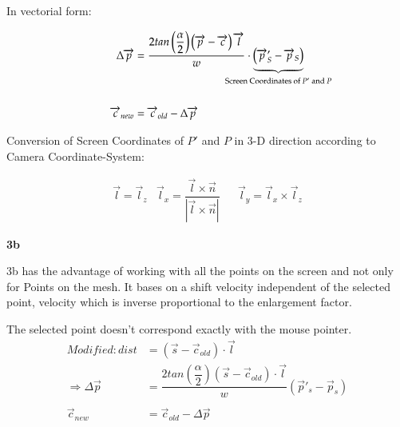 In vectorial form:                                                                                                                                                                                                                     

\begin{align*}  \Delta\overrightarrow{p} &= \dfrac{2tan\left(\dfrac{\alpha}{2}\right)\left(\overrightarrow{p} - \overrightarrow{c}\right) \overrightarrow{l}}{w} \cdot \underbrace{\left(\overrightarrow{p}'_{S} - \overrightarrow{p}_{S}\right)}_{ 
		\mathclap{\text{Screen Coordinates of $P'$ and $P$}}} \\                                                                                                                                                                                      \\ 
	\overrightarrow{c}_{new} &= \overrightarrow{c}_{old} -\Delta\overrightarrow{p}                                                                                                                                                                      
\end{align*}

Conversion of Screen Coordinates of $P'$ and $P$ in 3-D direction according to Camera Coordinate-System:

\begin{align*}
	& \overrightarrow{l} = \overrightarrow{l}_{z} & \overrightarrow{l}_{x} = \dfrac{\overrightarrow{l} \times \overrightarrow{n}}{|\overrightarrow{l}\times \overrightarrow{n}|} &   & \overrightarrow{l}_{y} = \overrightarrow{l}_{x} \times \overrightarrow{l}_{z} &   
\end{align*}

\noindent\textbf{3b} \newline

3b has the advantage of working with all the points on the screen and not only for Points on the \gls{mesh}. It bases on a shift velocity independent of the selected point, velocity which is inverse proportional to the enlargement factor.

The selected point doesn't correspond exactly with the mouse pointer.
\begin{align*} 
	Modified:  dist &= \left( \overrightarrow{s} - \overrightarrow{c}_{old}\right) \cdot \overrightarrow{l} \\
	\Rightarrow \Delta\overrightarrow{p} &= \dfrac{2tan\left(\dfrac{\alpha}{2}\right)\left(\overrightarrow{s} - \overrightarrow{c}_{old}\right) \cdot \overrightarrow{l}}{w} \left(\overrightarrow{p}'_{s} - \overrightarrow{p}_{s} \right)  \\
	\\
	\overrightarrow{c}_{new} &= \overrightarrow{c}_{old} - \Delta \overrightarrow{p}
\end{align*}

